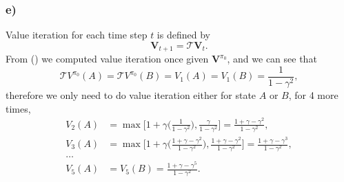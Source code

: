 \documentclass[12pt]{article}
\begin{document}
\subsubsection*{e)}
Value iteration for each time step $t$ is defined by
\begin{equation*}
    \mathbf{V}_{t+1} = \mathcal{T}\mathbf{V}_t.
\end{equation*}
From () we computed value iteration once given $\mathbf{V}^{\pi_0}$, and we can see that
\begin{equation*}
    \mathcal{T}V^{\pi_0}(A) = \mathcal{T}V^{\pi_0}(B) = V_1(A) = V_1(B) = \frac{1}{1-\gamma^2},
\end{equation*}
therefore we only need to do value iteration either for state $A$ or $B$, for 4 more times,
\begin{equation}
    \begin{split}
        V_2(A)&= \max \Big[1 + \gamma\Big(\frac{1}{1-\gamma^2}\Big), \frac{\gamma}{1-\gamma^2}\Big] = \frac{1+\gamma-\gamma^2}{1-\gamma^2}, \\
        V_3(A)&=\max \Big[1 + \gamma\Big(\frac{1+\gamma-\gamma^2}{1-\gamma^2}\Big), \frac{1+\gamma-\gamma^2}{1-\gamma^2}\Big] = \frac{1+\gamma-\gamma^3}{1-\gamma^2}, \\
        \dots \\
        V_5(A)&=V_5(B) = \frac{1+\gamma-\gamma^5}{1-\gamma^2}.
    \end{split}
    \label{eq:valiter}
\end{equation}
\end{document}
